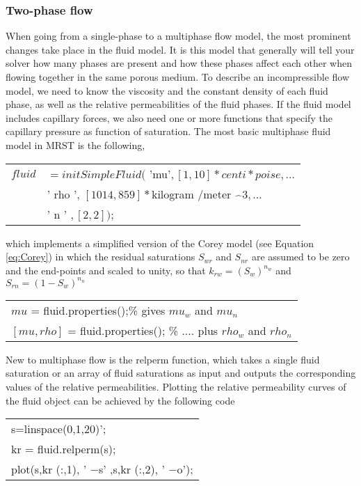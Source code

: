 \documentclass[a4paper,10pt]{report}
\begin{document}
\subsubsection{Two-phase flow}
When going from a single-phase to a multiphase flow model, the most prominent changes take place in the fluid model. It is this model that generally will
tell your solver how many phases are present and how these phases affect each
other when flowing together in the same porous medium. 
To describe an incompressible flow model, we need to know the viscosity
and the constant density of each fluid phase, as well as the relative permeabilities of the fluid phases. If the fluid model includes capillary forces, we also need one or more functions that specify the capillary pressure as function of saturation. The most basic multiphase fluid model in MRST is the following,
\begin{table}[!ht]
\centering
\begin{tabular}{ |cl |} 
\hline
$fluid$ &$= initSimpleFluid($ 'mu'$ , [ 1, 10]*centi* poise, ...$\\
&' rho ',  $ [1014, 859 ] * $kilogram /meter $\hat{ \text{ }} 3, ...$\\
&' n ' $, [ 2,2]);$\\
 \hline
\end{tabular}
\label{table:fluid}
\end{table}  

which implements a simplified version of the Corey model (see Equation \ref{eq:Corey}) in which the residual saturations $S_{wr}$ and $S_{nr}$ are assumed to be zero and the end-points
and  scaled to unity, so that $k_{rw} = (S_w)^{n_w}$ and $S_{rn} = (1 − S_w)^{n_n}$

\begin{table}[!ht]
\centering
\begin{tabular}{ |l |} 
\hline
$mu$ = fluid.properties();\% gives $mu_w$ and $mu_n$ \\
$[mu,rho]$ = fluid.properties(); \% .... plus $rho_w$ and $rho_n$\\
 \hline
\end{tabular}
\label{table:fluidp}
\end{table}  
New to multiphase flow is the relperm function, which takes a single fluid saturation or an array of fluid saturations as input and outputs the corresponding
values of the relative permeabilities. Plotting the relative permeability curves
of the fluid object can be achieved by the following code
\begin{table}[!ht]
\centering
\begin{tabular}{ |l |} 
\hline
s=linspace(0,1,20)';\\
kr = fluid.relperm(s);\\
plot(s,kr (:,1), ' −s' ,s,kr (:,2), ' −o');\\
 \hline
\end{tabular}
\label{table:fluid}
\end{table} 
\end{document}
